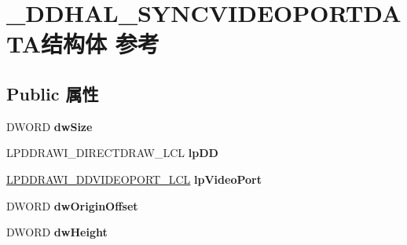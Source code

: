 \hypertarget{struct___d_d_h_a_l___s_y_n_c_v_i_d_e_o_p_o_r_t_d_a_t_a}{}\section{\+\_\+\+D\+D\+H\+A\+L\+\_\+\+S\+Y\+N\+C\+V\+I\+D\+E\+O\+P\+O\+R\+T\+D\+A\+T\+A结构体 参考}
\label{struct___d_d_h_a_l___s_y_n_c_v_i_d_e_o_p_o_r_t_d_a_t_a}
\subsection*{Public 属性}
\begin{DoxyCompactItemize}
\item 
\mbox{\label{struct___d_d_h_a_l___s_y_n_c_v_i_d_e_o_p_o_r_t_d_a_t_a_af3c20c3e24d3dd8d7a47b81f0e2b0661}} 
D\+W\+O\+RD {\bfseries dw\+Size}
\item 
\mbox{\label{struct___d_d_h_a_l___s_y_n_c_v_i_d_e_o_p_o_r_t_d_a_t_a_a0c6b1f295a15d897ff9294bc41290708}} 
L\+P\+D\+D\+R\+A\+W\+I\+\_\+\+D\+I\+R\+E\+C\+T\+D\+R\+A\+W\+\_\+\+L\+CL {\bfseries lp\+DD}
\item 
\mbox{\label{struct___d_d_h_a_l___s_y_n_c_v_i_d_e_o_p_o_r_t_d_a_t_a_a922fa23a3fe05daaa9fd2d2c1e46889f}} 
\hyperlink{struct___d_d_r_a_w_i___d_d_v_i_d_e_o_p_o_r_t___l_c_l}{L\+P\+D\+D\+R\+A\+W\+I\+\_\+\+D\+D\+V\+I\+D\+E\+O\+P\+O\+R\+T\+\_\+\+L\+CL} {\bfseries lp\+Video\+Port}
\item 
\mbox{\label{struct___d_d_h_a_l___s_y_n_c_v_i_d_e_o_p_o_r_t_d_a_t_a_afd8f7ebdd5ae5794ddf0bd3407d1207d}} 
D\+W\+O\+RD {\bfseries dw\+Origin\+Offset}
\item 
\mbox{\label{struct___d_d_h_a_l___s_y_n_c_v_i_d_e_o_p_o_r_t_d_a_t_a_ab162920beb89b43c4d429b84c016c32d}} 
D\+W\+O\+RD {\bfseries dw\+Height}
\item 
\mbox{\label{struct___d_d_h_a_l___s_y_n_c_v_i_d_e_o_p_o_r_t_d_a_t_a_ace969e5a92a5e6d38fbdc39c432b5272}} 

\end{DoxyCompactItemize}
